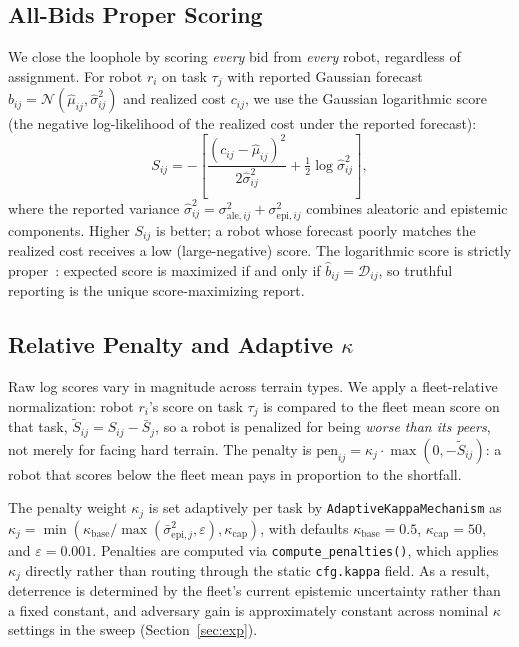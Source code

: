 \documentclass[letterpaper, 10pt, conference]{ieeeconf}
\begin{document}
\subsection{All-Bids Proper Scoring}
We close the loophole by scoring \emph{every} bid from \emph{every} robot,
regardless of assignment.  For robot $r_i$ on task $\tau_j$ with reported
Gaussian forecast $\hat{b}_{ij} = \mathcal{N}(\hat{\mu}_{ij}, \hat{\sigma}^2_{ij})$
and realized cost $c_{ij}$, we use the Gaussian logarithmic score (the negative
log-likelihood of the realized cost under the reported forecast):
\begin{equation}
  S_{ij} = -\left[\frac{(c_{ij} - \hat{\mu}_{ij})^2}{2\hat{\sigma}^2_{ij}}
  + \tfrac{1}{2}\log \hat{\sigma}^2_{ij}\right],
  \label{eq:logscore}
\end{equation}
where the reported variance $\hat{\sigma}^2_{ij} = \sigma^2_{\text{ale},ij} +
\sigma^2_{\text{epi},ij}$ combines aleatoric and epistemic components.  Higher
$S_{ij}$ is better; a robot whose forecast poorly matches the realized cost
receives a low (large-negative) score.  The logarithmic score is strictly
proper~\cite{gneiting2007strictly}: expected score is maximized if and only if
$\hat{b}_{ij} = \mathcal{D}_{ij}$, so truthful reporting is the unique
score-maximizing report.

\subsection{Relative Penalty and Adaptive $\kappa$}

Raw log scores vary in magnitude across terrain types.  We apply a
fleet-relative normalization: robot $r_i$'s score on task $\tau_j$ is
compared to the fleet mean score on that task, $\tilde{S}_{ij} = S_{ij} -
\bar{S}_j$, so a robot is penalized for being \emph{worse than its peers},
not merely for facing hard terrain.  The penalty is
$\text{pen}_{ij} = \kappa_j \cdot \max(0, -\tilde{S}_{ij})$: a robot that
scores below the fleet mean pays in proportion to the shortfall.

The penalty weight $\kappa_j$ is set adaptively per task by
\texttt{AdaptiveKappaMechanism} as $\kappa_j = \min(\kappa_\text{base} /
\max(\bar{\sigma}^2_{\text{epi},j}, \varepsilon), \kappa_\text{cap})$, with
defaults $\kappa_\text{base}=0.5$, $\kappa_\text{cap}=50$, and
$\varepsilon=0.001$.  Penalties are computed via
\texttt{compute\_penalties()}, which applies $\kappa_j$ directly rather than
routing through the static \texttt{cfg.kappa} field.  As a result, deterrence
is determined by the fleet's current epistemic uncertainty rather than a fixed
constant, and adversary gain is approximately constant across nominal $\kappa$
settings in the sweep (Section~\ref{sec:exp}).
\end{document}
